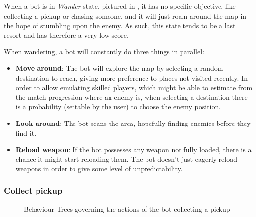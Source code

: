 When a bot is in \textit{Wander} state, pictured in , it has no specific objective, like collecting a pickup or chasing someone, and it will just roam around the map in the hope of stumbling upon the enemy. As such, this state tends to be a last resort and has therefore a very low score.

When wandering, a bot will constantly do three things in parallel:
\begin{itemize}
\item \textbf{Move around}: The bot will explore the map by selecting a random destination to reach, giving more preference to places not visited recently. In order to allow emulating skilled players, which might be able to estimate from the match progression where an enemy is, when selecting a destination there is a probability (settable by the user) to choose the enemy position.
\item \textbf{Look around}: The bot scans the area, hopefully finding enemies before they find it. 
\item \textbf{Reload weapon}: If the bot possesses any weapon not fully loaded, there is a chance it might start reloading them. The bot doesn’t just eagerly reload weapons in order to give some level of unpredictability.
\end{itemize}

\subsubsection{Collect pickup}
\begin{figure}
\centering
\captionsetup[subfigure]{}

\caption{Behaviour Trees governing the actions of the bot collecting a pickup}
\label{fig:pickup_bt}
\end{figure}

